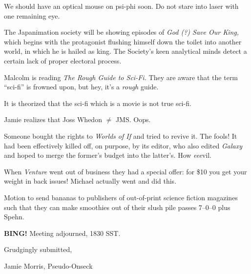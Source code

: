 \documentclass[10pt]{article}
\newcommand{\bing}{{\noindent\bf BING!} }
\newcommand{\ps}{ plus Spehn\xspace}
\begin{document}
We should have an optical mouse on psi-phi soon.  Do not stare into laser
with one remaining eye.

The Japanimation society will be showing episodes of \emph{God (?) Save
Our King,} which begins with the protagonist flushing himself down the
toilet into another world, in which he is hailed as king.  The Society's
keen analytical minds detect a certain lack of proper electoral process.

Malcolm is reading \emph{The Rough Guide to Sci-Fi.}  They are aware
that the term ``sci-fi'' is frowned upon, but hey, it's a \emph{rough} guide.

It is theorized that the sci-fi which is a movie is not true sci-fi.

Jamie realizes that Joss Whedon $\neq$ JMS.  Oops.

Someone bought the rights to \emph{Worlds of If} and tried to revive it.
The fools!  It had been effectively killed off, on purpose, by its editor,
who also edited \emph{Galaxy} and hoped to merge the former's budget
into the latter's.  How \emph{eee}vil.

When \emph{Venture} went out of business they had a special offer: for \$10
you get your weight in back issues!  Michael actually went and did this.

Motion to send bananas to publishers of out-of-print science fiction magazines
such that they can make smoothies out of their slush pile passes 7--0--0\ps.

\bing
\noindent
Meeting adjourned, 1830 SST.

\vspace{18pt}

\centerline{Grudgingly submitted,}
\centerline{Jamie Morris, Pseudo-Onseck}
\end{document}
